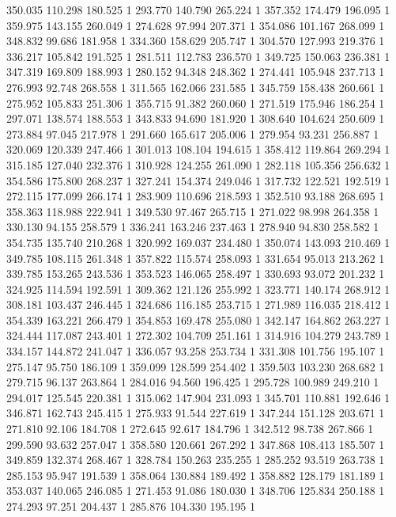 	350.035	110.298	180.525	1
	293.770	140.790	265.224	1
	357.352	174.479	196.095	1
	359.975	143.155	260.049	1
	274.628	97.994	207.371	1
	354.086	101.167	268.099	1
	348.832	99.686	181.958	1
	334.360	158.629	205.747	1
	304.570	127.993	219.376	1
	336.217	105.842	191.525	1
	281.511	112.783	236.570	1
	349.725	150.063	236.381	1
	347.319	169.809	188.993	1
	280.152	94.348	248.362	1
	274.441	105.948	237.713	1
	276.993	92.748	268.558	1
	311.565	162.066	231.585	1
	345.759	158.438	260.661	1
	275.952	105.833	251.306	1
	355.715	91.382	260.060	1
	271.519	175.946	186.254	1
	297.071	138.574	188.553	1
	343.833	94.690	181.920	1
	308.640	104.624	250.609	1
	273.884	97.045	217.978	1
	291.660	165.617	205.006	1
	279.954	93.231	256.887	1
	320.069	120.339	247.466	1
	301.013	108.104	194.615	1
	358.412	119.864	269.294	1
	315.185	127.040	232.376	1
	310.928	124.255	261.090	1
	282.118	105.356	256.632	1
	354.586	175.800	268.237	1
	327.241	154.374	249.046	1
	317.732	122.521	192.519	1
	272.115	177.099	266.174	1
	283.909	110.696	218.593	1
	352.510	93.188	268.695	1
	358.363	118.988	222.941	1
	349.530	97.467	265.715	1
	271.022	98.998	264.358	1
	330.130	94.155	258.579	1
	336.241	163.246	237.463	1
	278.940	94.830	258.582	1
	354.735	135.740	210.268	1
	320.992	169.037	234.480	1
	350.074	143.093	210.469	1
	349.785	108.115	261.348	1
	357.822	115.574	258.093	1
	331.654	95.013	213.262	1
	339.785	153.265	243.536	1
	353.523	146.065	258.497	1
	330.693	93.072	201.232	1
	324.925	114.594	192.591	1
	309.362	121.126	255.992	1
	323.771	140.174	268.912	1
	308.181	103.437	246.445	1
	324.686	116.185	253.715	1
	271.989	116.035	218.412	1
	354.339	163.221	266.479	1
	354.853	169.478	255.080	1
	342.147	164.862	263.227	1
	324.444	117.087	243.401	1
	272.302	104.709	251.161	1
	314.916	104.279	243.789	1
	334.157	144.872	241.047	1
	336.057	93.258	253.734	1
	331.308	101.756	195.107	1
	275.147	95.750	186.109	1
	359.099	128.599	254.402	1
	359.503	103.230	268.682	1
	279.715	96.137	263.864	1
	284.016	94.560	196.425	1
	295.728	100.989	249.210	1
	294.017	125.545	220.381	1
	315.062	147.904	231.093	1
	345.701	110.881	192.646	1
	346.871	162.743	245.415	1
	275.933	91.544	227.619	1
	347.244	151.128	203.671	1
	271.810	92.106	184.708	1
	272.645	92.617	184.796	1
	342.512	98.738	267.866	1
	299.590	93.632	257.047	1
	358.580	120.661	267.292	1
	347.868	108.413	185.507	1
	349.859	132.374	268.467	1
	328.784	150.263	235.255	1
	285.252	93.519	263.738	1
	285.153	95.947	191.539	1
	358.064	130.884	189.492	1
	358.882	128.179	181.189	1
	353.037	140.065	246.085	1
	271.453	91.086	180.030	1
	348.706	125.834	250.188	1
	274.293	97.251	204.437	1
	285.876	104.330	195.195	1
